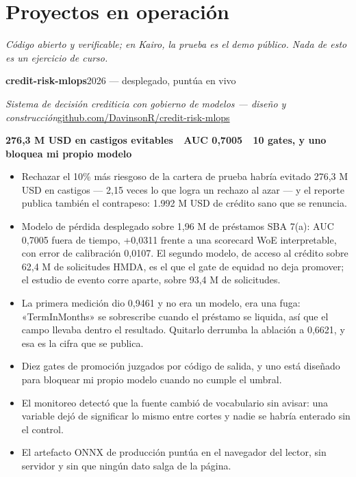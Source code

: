 \documentclass[a4paper,10pt]{article}
\newcommand{\headline}[2]{\needspace{3\baselineskip}\textbf{\color{ink}#1}\hfill{\small #2}\par}
\newcommand{\subline}[2]{\textit{#1}\hfill{\small #2}\par}
\begin{document}
\section*{Proyectos en operación}
{\small\itshape Código abierto y verificable; en Kairo, la prueba es el demo público. Nada de esto es un ejercicio de curso.}\par\vspace{3pt}
\headline{credit-risk-mlops}{2026 --- desplegado, puntúa en vivo}
\subline{Sistema de decisión crediticia con gobierno de modelos --- diseño y construcción}{\href{https://github.com/DavinsonR/credit-risk-mlops}{github.com/DavinsonR/credit-risk-mlops}}
{\small\bfseries\color{cold} 276,3 M USD en castigos evitables \,\textperiodcentered\, AUC 0,7005 \,\textperiodcentered\, 10 gates, y uno bloquea mi propio modelo}\par
\begin{itemize}[leftmargin=1.1em, itemsep=0pt, topsep=1pt, parsep=0pt]
  \item Rechazar el 10\% más riesgoso de la cartera de prueba habría evitado 276,3 M USD en castigos --- 2,15 veces lo que logra un rechazo al azar --- y el reporte publica también el contrapeso: 1.992 M USD de crédito sano que se renuncia.
  \item Modelo de pérdida desplegado sobre 1,96 M de préstamos SBA 7(a): AUC 0,7005 fuera de tiempo, +0,0311 frente a una scorecard WoE interpretable, con error de calibración 0,0107. El segundo modelo, de acceso al crédito sobre 62,4 M de solicitudes HMDA, es el que el gate de equidad no deja promover; el estudio de evento corre aparte, sobre 93,4 M de solicitudes.
  \item La primera medición dio 0,9461 y no era un modelo, era una fuga: «TermInMonths» se sobrescribe cuando el préstamo se liquida, así que el campo llevaba dentro el resultado. Quitarlo derrumba la ablación a 0,6621, y esa es la cifra que se publica.
  \item Diez gates de promoción juzgados por código de salida, y uno está diseñado para bloquear mi propio modelo cuando no cumple el umbral.
  \item El monitoreo detectó que la fuente cambió de vocabulario sin avisar: una variable dejó de significar lo mismo entre cortes y nadie se habría enterado sin el control.
  \item El artefacto ONNX de producción puntúa en el navegador del lector, sin servidor y sin que ningún dato salga de la página.
\end{itemize}
\end{document}
